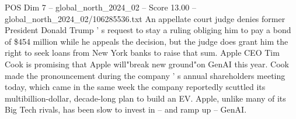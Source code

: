 \begin{textsample}{POS Dim 7 – global\_north\_2024\_02 – Score 13.00 – global\_north\_2024\_02/106285536.txt}
An appellate court judge denies former President Donald Trump ' s request to stay a ruling obliging him to pay a bond of \$454 million while he appeals the decision, but the judge does grant him the right to seek loans from New York banks to raise that sum.
Apple CEO Tim Cook is promising that Apple will"break new ground"on GenAI this year.
Cook made the pronouncement during the company ' s annual shareholders meeting today, which came in the same week the company reportedly scuttled its multibillion-dollar, decade-long plan to build an EV.
Apple, unlike many of its Big Tech rivals, has been slow to invest in -- and ramp up -- GenAI.

\end{textsample}
